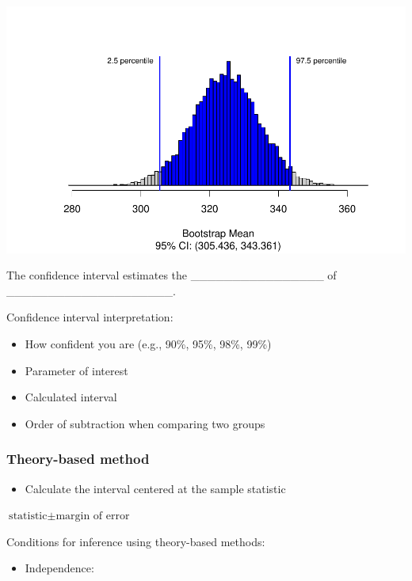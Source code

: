 \documentclass[
]{report}
\providecommand{\tightlist}{%
  \setlength{\itemsep}{0pt}\setlength{\parskip}{0pt}}
\newcommand{\rgi}{\hspace{24pt}}  %
\begin{document}
\begin{center}\includegraphics[width=0.7\linewidth]{07-VN07-one_meantheory_files/figure-latex/unnamed-chunk-4-1} \end{center}

The confidence interval estimates the \_\_\_\_\_\_\_\_\_\_\_\_\_\_\_\_
of \_\_\_\_\_\_\_\_\_\_\_\_\_\_\_\_\_\_\_\_.

Confidence interval interpretation:

\begin{itemize}
\item
  How confident you are (e.g., 90\%, 95\%, 98\%, 99\%)
\item
  Parameter of interest
\item
  Calculated interval
\item
  Order of subtraction when comparing two groups
\end{itemize}

\vspace{0.8in}

\newpage

\subsubsection*{Theory-based method}\label{theory-based-method-1}

\begin{itemize}
\tightlist
\item
  Calculate the interval centered at the sample statistic
\end{itemize}

\rgi \(\text{statistic} \pm \text{margin of error}\)

\vspace{0.5in}

Conditions for inference using theory-based methods:

\begin{itemize}
\tightlist
\item
  Independence:
\end{itemize}
\end{document}
